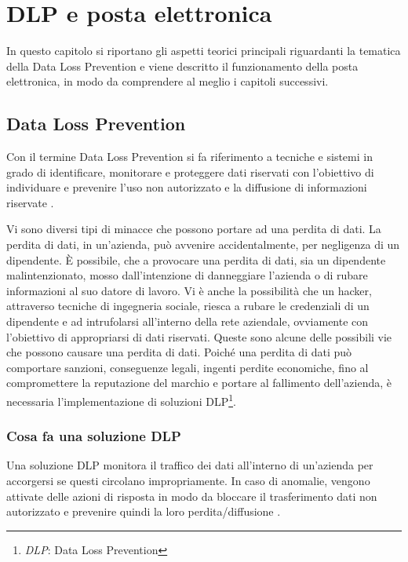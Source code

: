 \chapter{DLP e posta elettronica}

In questo capitolo si riportano gli aspetti teorici principali riguardanti la tematica della Data Loss Prevention
e viene descritto il funzionamento della posta elettronica, in modo da comprendere al meglio i capitoli
successivi.

\section{Data Loss Prevention}
Con il termine Data Loss Prevention si fa riferimento a 
tecniche e sistemi in grado di identificare, monitorare 
e proteggere dati riservati con l’obiettivo di individuare 
e prevenire l’uso non autorizzato e la diffusione di informazioni riservate \cite{DLP1}. 

Vi sono diversi tipi di minacce che possono portare ad una perdita di dati.
La perdita di dati, in un'azienda, può avvenire accidentalmente, per negligenza di un 
dipendente. È possibile, che a provocare una perdita di dati, sia un dipendente malintenzionato,
mosso dall'intenzione di danneggiare l'azienda o di rubare informazioni al suo datore di lavoro.
Vi è anche la possibilità che un hacker, attraverso tecniche di ingegneria sociale, riesca a rubare
le credenziali di un dipendente e ad intrufolarsi all'interno della rete aziendale, ovviamente con 
l'obiettivo di appropriarsi di dati riservati.
Queste sono alcune delle possibili vie che possono causare una perdita di dati. Poiché una perdita di dati
può comportare sanzioni, conseguenze legali, ingenti perdite economiche, fino al compromettere la reputazione del 
marchio e portare al fallimento dell'azienda, è necessaria l'implementazione di soluzioni
DLP\footnote{\textit{DLP}: Data Loss Prevention}.
 

\subsection{Cosa fa una soluzione DLP}
    Una soluzione DLP monitora il traffico dei dati all'interno di un'azienda per accorgersi se
    questi circolano impropriamente. In caso di anomalie, vengono attivate delle azioni di risposta 
    in modo da bloccare il trasferimento dati non autorizzato e prevenire quindi la loro perdita/diffusione \cite{DLP2}.
    


